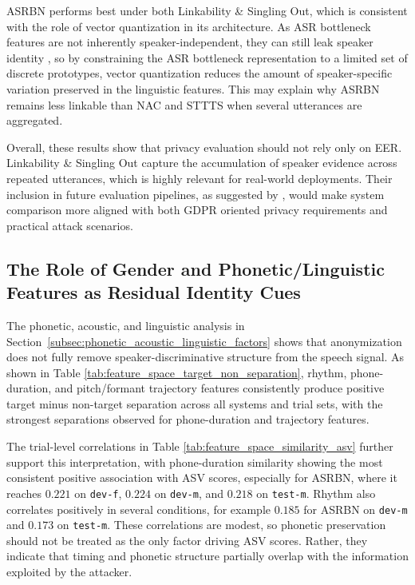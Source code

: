 \documentclass[12pt,leqno,a4paper]{article}
\begin{document}
ASRBN performs best under both Linkability \& Singling Out, which is consistent with the role of vector quantization in its architecture. 
As ASR bottleneck features are not inherently speaker-independent, they can still leak speaker identity \citep{champion_anonymizing_2024}, so
by constraining the ASR bottleneck representation to a limited set of discrete prototypes, vector quantization reduces the amount of speaker-specific variation preserved in the linguistic features.
This may explain why ASRBN remains less linkable than NAC and STTTS when several utterances are aggregated. 

Overall, these results show that privacy evaluation should not rely only on EER. Linkability \& Singling Out capture the accumulation of speaker evidence across repeated utterances, which is highly relevant for real-world deployments. 
Their inclusion in future evaluation pipelines, as suggested by \cite{tomashenko_third_2026}, would make system comparison more aligned with both GDPR oriented privacy requirements and practical attack scenarios.

\subsection{The Role of Gender and Phonetic/Linguistic Features as Residual Identity Cues}
\label{subsubsec:phonetic_linguistic_discussion}

The phonetic, acoustic, and linguistic analysis in Section~\ref{subsec:phonetic_acoustic_linguistic_factors} shows that anonymization does not fully remove speaker-discriminative structure from the speech signal.
As shown in Table \ref{tab:feature_space_target_non_separation}, rhythm, phone-duration, and pitch/formant trajectory features consistently produce positive target minus non-target separation across all systems and trial sets, with the 
strongest separations observed for phone-duration and trajectory features.

The trial-level correlations in Table \ref{tab:feature_space_similarity_asv} further support this interpretation, with phone-duration similarity showing
the most consistent positive association with ASV scores, especially for ASRBN, where it reaches $0.221$ on \texttt{dev-f}, $0.224$ on \texttt{dev-m}, and $0.218$ on \texttt{test-m}.
Rhythm also correlates positively in several conditions, for example $0.185$ for ASRBN on \texttt{dev-m} and $0.173$ on \texttt{test-m}. 
These correlations are modest, so phonetic preservation should not be treated as the only factor driving ASV scores. Rather, they indicate that timing and phonetic structure partially overlap with the information exploited by the attacker.
\end{document}
